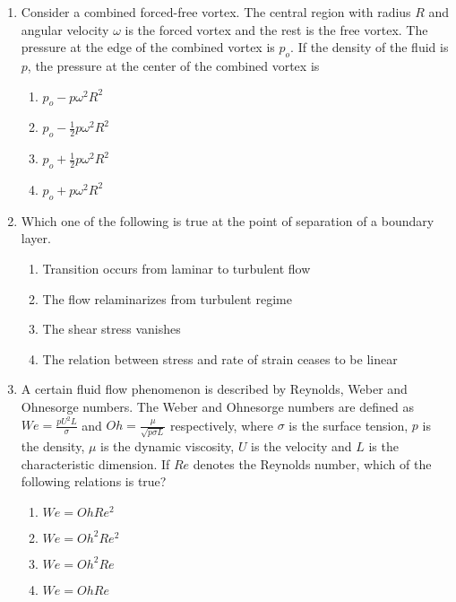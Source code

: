 \documentclass[journal]{IEEEtran}
\begin{document}
\begin{enumerate}[start=27]
    \item Consider a combined forced-free vortex. The central region with radius $R$ and angular velocity $\omega$ is the forced vortex and the rest is the free vortex. The pressure at the edge of the combined vortex is $p_o$. If the density of the fluid is $p$, the pressure at the center of the combined vortex is
    \begin{multicols}{4}
        \begin{enumerate}
            \item $p_o - p\omega^2 R^2$
            \item $p_o - \frac{1}{2}p\omega^2 R^2$
            \item $p_o + \frac{1}{2}p\omega^2 R^2$
            \item $p_o + p\omega^2 R^2$
        \end{enumerate}
    \end{multicols}

    \item Which one of the following is true at the point of separation of a boundary layer.
    \begin{enumerate}
        \item Transition occurs from laminar to turbulent flow
        \item The flow relaminarizes from turbulent regime
        \item The shear stress vanishes
        \item The relation between stress and rate of strain ceases to be linear
    \end{enumerate}

    \item A certain fluid flow phenomenon is described by Reynolds, Weber and Ohnesorge numbers. The Weber and Ohnesorge numbers are defined as $We = \frac{pU^2L}{\sigma}$ and $Oh =\frac{\mu}{\sqrt{p\sigma L}} $ respectively, where $\sigma$ is the surface tension, $p$ is the density, $\mu$ is the dynamic viscosity, $U$ is the velocity and $L$ is the characteristic dimension. If $Re$ denotes the Reynolds number, which of the following relations is true?
    \begin{multicols}{4}
        \begin{enumerate}
            \item $We=Oh Re^2$
            \item $We=Oh^2 Re^2$
            \item $We=Oh^2 Re$
            \item $We=Oh Re$
        \end{enumerate}
    \end{multicols}


\end{enumerate}
\end{document}
